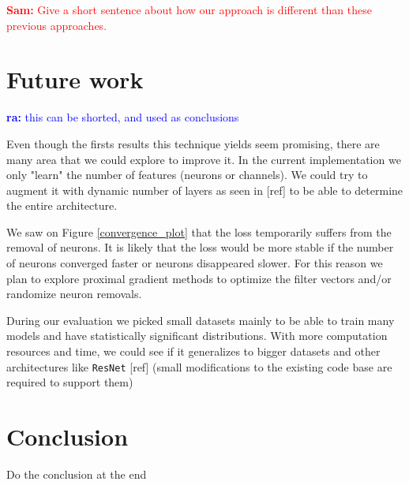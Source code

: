 \documentclass[sigconf]{acmart}
\newcommand{\srm}[1]{\textcolor{red}{{\bf Sam:} #1}}
\newcommand{\ra}[1]{\textcolor{blue}{{\bf ra:} #1}}
\begin{document}
\srm{Give a short sentence about how our approach is
different than these previous approaches.} 

\section{Future work}

\ra{this can be shorted, and used as conclusions}

\par Even though the firsts results this technique yields seem promising, there
are many area that we could explore to improve it. In the current implementation
we only "learn" the number of features (neurons or channels). We could try to
augment it with dynamic number of layers as seen in [ref] to be able to
determine the entire architecture.  \par We saw on Figure \ref{convergence_plot}
that the loss temporarily suffers from the removal of neurons. It is likely that
the loss would be more stable if the number of neurons converged faster or
neurons disappeared slower. For this reason we plan to explore proximal gradient
methods to optimize the filter vectors and/or randomize neuron removals.  \par
During our evaluation we picked small datasets mainly to be able to train many
models and have statistically significant distributions. With more computation
resources and time, we could see if it generalizes to bigger datasets and other
architectures like \texttt{ResNet} [ref] (small modifications to the existing
code base are required to support them)

\section{Conclusion}
Do the conclusion at the end



\end{document}
